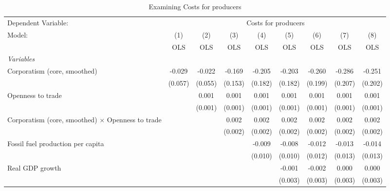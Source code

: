 
\begin{table}[htbp]
   \caption{Examining Costs for producers}
   \centering
   \begin{tabular}{lcccccccc}
      \toprule
      Dependent Variable: & \multicolumn{8}{c}{Costs for producers}\\
      Model:                                                   & (1)     & (2)     & (3)     & (4)     & (5)     & (6)     & (7)     & (8)\\  
                                                               &  OLS    & OLS     & OLS     & OLS     & OLS     & OLS     & OLS     & OLS\\  
      \midrule
      \emph{Variables}\\
      Corporatism (core, smoothed)                             & -0.029  & -0.022  & -0.169  & -0.205  & -0.203  & -0.260  & -0.286  & -0.251\\   
                                                               & (0.057) & (0.055) & (0.153) & (0.182) & (0.182) & (0.199) & (0.207) & (0.202)\\   
      Openness to trade                                        &         & 0.001   & 0.001   & 0.001   & 0.001   & 0.001   & 0.001   & 0.001\\   
                                                               &         & (0.001) & (0.001) & (0.001) & (0.001) & (0.001) & (0.001) & (0.001)\\   
      Corporatism (core, smoothed) $\times$ Openness to trade  &         &         & 0.002   & 0.002   & 0.002   & 0.002   & 0.002   & 0.002\\   
                                                               &         &         & (0.002) & (0.002) & (0.002) & (0.002) & (0.002) & (0.002)\\   
      Fossil fuel production per capita                        &         &         &         & -0.009  & -0.008  & -0.012  & -0.013  & -0.014\\   
                                                               &         &         &         & (0.010) & (0.010) & (0.012) & (0.013) & (0.013)\\   
      Real GDP growth                                          &         &         &         &         & -0.001  & -0.002  & 0.000   & 0.000\\   
                                                               &         &         &         &         & (0.003) & (0.003) & (0.003) & (0.003)\\   

\end{tabular}
\end{table}
